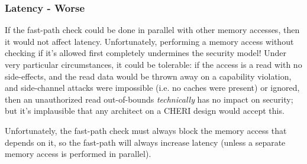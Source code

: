\subsubsection*{Latency - Worse}
If the fast-path check could be done in parallel with other memory accesses, then it would not affect latency.
Unfortunately, performing a memory access without checking if it's allowed first completely undermines the security model!
Under very particular circumstances, it could be tolerable: if the access is a read with no side-effects, and the read data would be thrown away on a capability violation, and side-channel attacks were impossible (i.e. no caches were present) or ignored, then an unauthorized read out-of-bounds \emph{technically} has no impact on security; but it's implausible that any architect on a CHERI design would accept this.

Unfortunately, the fast-path check must always block the memory access that depends on it, so the fast-path will always increase latency (unless a separate memory access is performed in parallel).